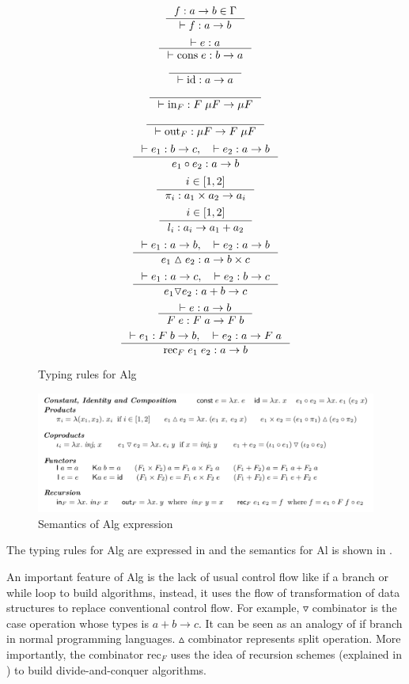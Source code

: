 \begin{figure}[ht]
    \[\inference{f : a -> b \in \Gamma}{|- f : a -> b}\]
    \[\inference{|- e : a}{|- \text{cons} \; e : b -> a}\]
    \[\inference{}{|- \text{id} : a -> a}\]
    \[\inference{}{|- \text{in}_F : F \; \mu F -> \mu F}\]
    \[\inference{}{|- \text{out}_F : \mu F -> F \; \mu F}\]
    \[\inference{|- e_1 : b -> c, \quad |- e_2 : a -> b}{e_1 \circ e_2: a -> b}\]
    \[\inference{i \in [1,2]}{\pi_i : a_1 \times a_2 -> a_i}\]
    \[\inference{i \in [1,2]}{l_i : a_i -> a_1 + a_2}\]
    \[\inference{|- e_1 : a -> b, \quad |- e_2 : a -> b}{e_1 \vartriangle e_2: a -> b \times c}\]
    \[\inference{|- e_1 : a -> c, \quad |- e_2 : b -> c}{e_1 \triangledown e_2: a + b -> c}\]
    \[\inference{|- e : a -> b}{F \; e : F \; a -> F \; b}\]
    \[\inference{|- e_1 : F \; b -> b, \quad |- e_2 : a -> F \; a}{\text{rec}_F \; e_1 \; e_2: a -> b}\]
    \caption{Typing rules for Alg}
    \label{project:typing}
\end{figure}
\begin{figure}[ht]
    \includegraphics[width=\textwidth]{project/semantics.png}
    \caption{Semantics of Alg expression\cite{castroAlgebraicMultipartyProtocol}} 
    \label{project:Semantics}
\end{figure}

The typing rules for Alg are expressed in  and the semantics for Al is shown in . 

An important feature of Alg is the lack of usual control flow like if a branch or while loop to build algorithms, instead, it uses the flow of transformation of data structures to replace conventional control flow. For example, $\triangledown$ combinator is the case operation whose types is $a + b \rightarrow c$. It can be seen as an analogy of if branch in normal programming languages. $\vartriangle$ combinator represents split operation. More importantly, the combinator $\text{rec}_F$ uses the idea of recursion schemes (explained in ) to build divide-and-conquer algorithms. 

